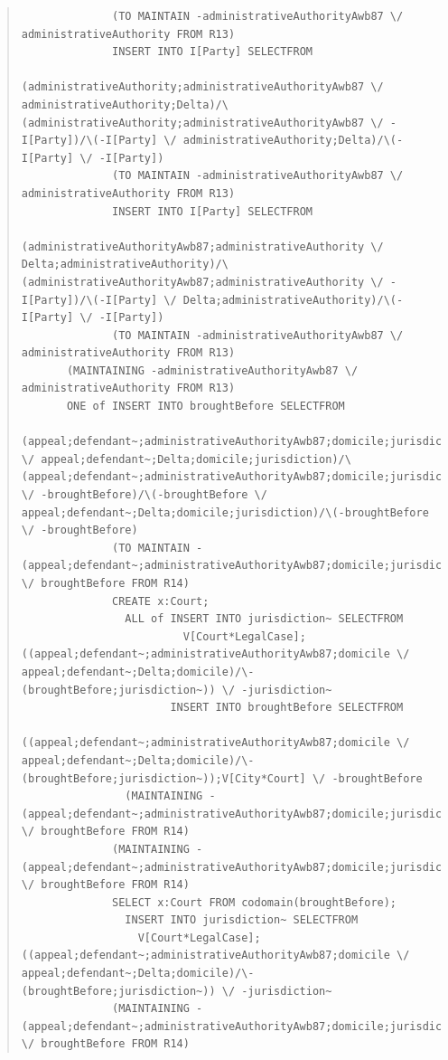 \documentclass[10pt,a4paper]{report}              %
\theoremstyle{plain}\theorembodyfont{\rmfamily}\newtheorem{definition}{Definition}[section]
\theoremstyle{plain}\theorembodyfont{\rmfamily}\newtheorem{designrule}[definition]{Requirement}
\begin{document}
\begin{quote}
\begin{verbatim}
              (TO MAINTAIN -administrativeAuthorityAwb87 \/ administrativeAuthority FROM R13)
              INSERT INTO I[Party] SELECTFROM
                (administrativeAuthority;administrativeAuthorityAwb87 \/ administrativeAuthority;Delta)/\(administrativeAuthority;administrativeAuthorityAwb87 \/ -I[Party])/\(-I[Party] \/ administrativeAuthority;Delta)/\(-I[Party] \/ -I[Party])
              (TO MAINTAIN -administrativeAuthorityAwb87 \/ administrativeAuthority FROM R13)
              INSERT INTO I[Party] SELECTFROM
                (administrativeAuthorityAwb87;administrativeAuthority \/ Delta;administrativeAuthority)/\(administrativeAuthorityAwb87;administrativeAuthority \/ -I[Party])/\(-I[Party] \/ Delta;administrativeAuthority)/\(-I[Party] \/ -I[Party])
              (TO MAINTAIN -administrativeAuthorityAwb87 \/ administrativeAuthority FROM R13)
       (MAINTAINING -administrativeAuthorityAwb87 \/ administrativeAuthority FROM R13)
       ONE of INSERT INTO broughtBefore SELECTFROM
                (appeal;defendant~;administrativeAuthorityAwb87;domicile;jurisdiction \/ appeal;defendant~;Delta;domicile;jurisdiction)/\(appeal;defendant~;administrativeAuthorityAwb87;domicile;jurisdiction \/ -broughtBefore)/\(-broughtBefore \/ appeal;defendant~;Delta;domicile;jurisdiction)/\(-broughtBefore \/ -broughtBefore)
              (TO MAINTAIN -(appeal;defendant~;administrativeAuthorityAwb87;domicile;jurisdiction) \/ broughtBefore FROM R14)
              CREATE x:Court;
                ALL of INSERT INTO jurisdiction~ SELECTFROM
                         V[Court*LegalCase];((appeal;defendant~;administrativeAuthorityAwb87;domicile \/ appeal;defendant~;Delta;domicile)/\-(broughtBefore;jurisdiction~)) \/ -jurisdiction~
                       INSERT INTO broughtBefore SELECTFROM
                         ((appeal;defendant~;administrativeAuthorityAwb87;domicile \/ appeal;defendant~;Delta;domicile)/\-(broughtBefore;jurisdiction~));V[City*Court] \/ -broughtBefore
                (MAINTAINING -(appeal;defendant~;administrativeAuthorityAwb87;domicile;jurisdiction) \/ broughtBefore FROM R14)
              (MAINTAINING -(appeal;defendant~;administrativeAuthorityAwb87;domicile;jurisdiction) \/ broughtBefore FROM R14)
              SELECT x:Court FROM codomain(broughtBefore);
                INSERT INTO jurisdiction~ SELECTFROM
                  V[Court*LegalCase];((appeal;defendant~;administrativeAuthorityAwb87;domicile \/ appeal;defendant~;Delta;domicile)/\-(broughtBefore;jurisdiction~)) \/ -jurisdiction~
              (MAINTAINING -(appeal;defendant~;administrativeAuthorityAwb87;domicile;jurisdiction) \/ broughtBefore FROM R14)

\end{verbatim}
\end{quote}
\end{document}
